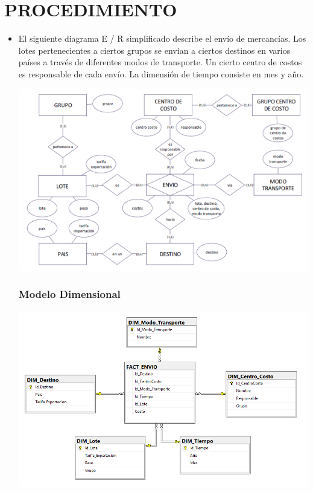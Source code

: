 \section{PROCEDIMIENTO} 

\begin{itemize}
\subsection{Ejercicio 1: Envios}
	\subsubsection{Enunciado}

		\item El siguiente diagrama E / R simplificado describe el envío de mercancías. Los lotes pertenecientes a ciertos grupos se
envían a ciertos destinos en varios países a través de diferentes modos de transporte. Un cierto centro de costos es responsable de cada envío. La dimensión de tiempo consiste en mes y año.

	\begin{center}
	\includegraphics[width=14cm]{./Imagenes/ejercicio1}
	\end{center}

     \subsubsection{Modelo Dimensional }
	\begin{center}
	\includegraphics[width=14cm]{./Imagenes/ejercicio1_dimensional}
	\end{center}

\end{itemize}
